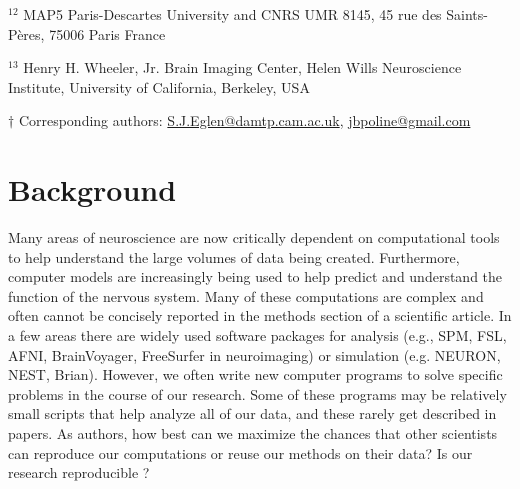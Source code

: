 \documentclass[11pt]{article}
\begin{document}
\noindent $^{12}$ MAP5 Paris-Descartes University and CNRS UMR 8145, 
45 rue des Saints-P\`{e}res, 75006 Paris France

\noindent $^{13}$  Henry H. Wheeler, Jr. Brain Imaging Center, Helen Wills Neuroscience Institute, University of California, Berkeley, USA

\vspace*{2mm}
\noindent $\dagger$
Corresponding authors: \url{S.J.Eglen@damtp.cam.ac.uk}, \url{jbpoline@gmail.com}

\clearpage


\renewcommand{\cite}[1]{\autocite{#1}}

\linenumbers

\section*{Background}

Many areas of neuroscience are now critically dependent on
computational tools to help understand the large volumes of data being
created.  Furthermore, computer models are increasingly being used to
help predict and understand the function of the nervous system.  Many
of these computations are complex and often cannot be concisely
reported in the methods section of a scientific article.  In a few
areas there are widely used software packages for
analysis (e.g., SPM, FSL, AFNI, BrainVoyager, FreeSurfer in
neuroimaging) or simulation (e.g. NEURON, NEST, Brian).
However, we often write new computer programs to solve
specific problems in the course of our research.  Some of these
programs may be relatively small scripts that help analyze all of our
data, and these rarely get described in papers.  As authors, how best
can we maximize the chances that other scientists can reproduce our
computations or reuse our methods on their data?  Is our research
reproducible \cite{web:naturefocus}?
\end{document}
